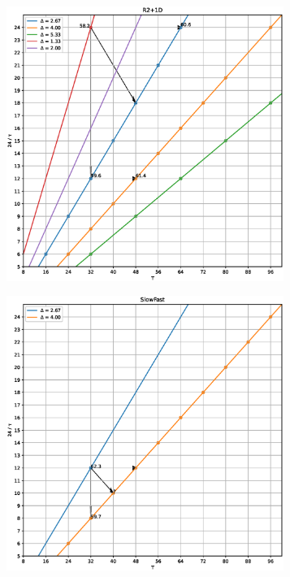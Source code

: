 \begin{figure}
    \centering
    \begin{subfigure}{.33\textwidth}
        \centering
        \includegraphics[width=0.99\textwidth, keepaspectratio, interpolate]{img/07_grid_r2plus1d.eps}
    \end{subfigure}%
    \begin{subfigure}{.33\textwidth}
        \centering
        \includegraphics[width=0.99\textwidth, keepaspectratio, interpolate]{img/07_grid_slowfast.eps}

\end{subfigure}
\end{figure}
